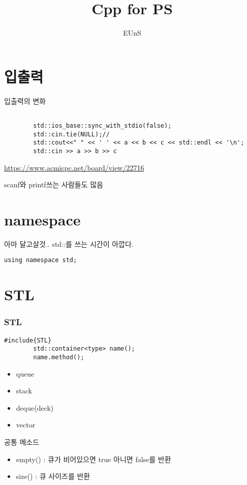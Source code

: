 \documentclass[10pt]{beamer}
\title{Cpp for PS}
\author{EUnS}
\begin{document}
\begin{frame}
  \maketitle
\end{frame}

\section{입출력}
\begin{frame}[fragile]{입출력의 변화}
    \begin{lstlisting}[style = CStyle]
    
        std::ios_base::sync_with_stdio(false); 
        std::cin.tie(NULL);//
        std::cout<<" " << ' ' << a << b << c << std::endl << '\n';
        std::cin >> a >> b >> c 
    \end{lstlisting}
    \url{https://www.acmicpc.net/board/view/22716}

    scanf와 printf쓰는 사람들도 많음
\end{frame}

\section{namespace}

\begin{frame}[fragile]{아마 달고살것..}
    std::를 쓰는 시간이 아깝다.

    \begin{lstlisting}[style = CStyle]
        using namespace std;
    \end{lstlisting}
        
\end{frame}

\section{STL}

\begin{frame}[fragile]
    \frametitle{STL}
    
    \begin{lstlisting}[style = CStyle]
        #include{STL}
        std::container<type> name();
        name.method();
    \end{lstlisting}

    \begin{itemize}
        \item queue
        \item stack
        \item deque(deck)
        \item vector
    \end{itemize}
    공통 메소드
    \begin{itemize}
        \item empty() : 큐가 비어있으면 true 아니면 false를 반환
        \item size() : 큐 사이즈를 반환
    \end{itemize}
\end{frame}
\end{document}
